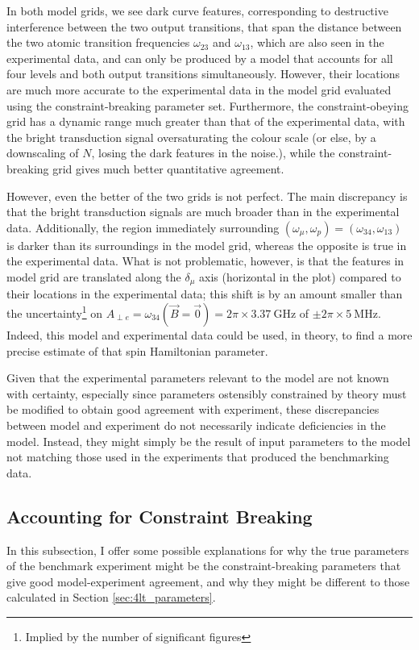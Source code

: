 In both model grids, we see dark curve features, corresponding to destructive interference between the two output transitions, that span the distance between the two atomic transition frequencies $\omega_{23}$ and $\omega_{13}$, which are also seen in the experimental data, and can only be produced by a model that accounts for all four levels and both output transitions simultaneously. However, their locations are much more accurate to the experimental data in the model grid evaluated using the constraint-breaking parameter set. Furthermore, the constraint-obeying grid has a dynamic range much greater than that of the experimental data, with the bright transduction signal oversaturating the colour scale (or else, by a downscaling of $N$, losing the dark features in the noise.), while the constraint-breaking grid gives much better quantitative agreement.

However, even the better of the two grids is not perfect. The main discrepancy is that the bright transduction signals are much broader than in the experimental data. Additionally, the region immediately surrounding $(\omega_\mu, \omega_p) = (\omega_{34}, \omega_{13})$ is darker than its surroundings in the model grid, whereas the opposite is true in the experimental data. What is not problematic, however, is that the features in model grid are translated along the $\delta_{\mu}$ axis (horizontal in the plot) compared to their locations in the experimental data; this shift is by an amount smaller than the uncertainty\footnote{Implied by the number of significant figures} on $A_{\perp e} = \omega_{34}(\vec{B}=\vec{0}) = 2\pi \times \qty{3.37}{\giga\hertz}$ of $\pm 2\pi\times\qty{5}{\mega\hertz}$. Indeed, this model and experimental data could be used, in theory, to find a more precise estimate of that spin Hamiltonian parameter.

Given that the experimental parameters relevant to the model are not known with certainty, especially since parameters ostensibly constrained by theory must be modified to obtain good agreement with experiment, these discrepancies between model and experiment do not necessarily indicate deficiencies in the model. Instead, they might simply be the result of input parameters to the model not matching those used in the experiments that produced the benchmarking data.

\subsection{Accounting for Constraint Breaking}
In this subsection, I offer some possible explanations for why the true parameters of the benchmark experiment might be the constraint-breaking parameters that give good model-experiment agreement, and why they might be different to those calculated in Section \ref{sec:4lt_parameters}.

